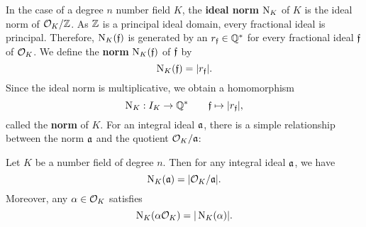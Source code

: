     In the case of a degree $n$ number field $K$, the \textbf{ideal norm} $\operatorname{\mathrm{N}}_{K}$ of $K$ is the ideal norm of $\mathcal{O}_{K}/\mathbb{Z}$. As $\mathbb{Z}$ is a principal ideal domain, every fractional ideal is principal. Therefore, $\operatorname{\mathrm{N}}_{K}(\mathfrak{f})$ is generated by an $r_{\mathfrak{f}} \in \mathbb{Q}^{\ast}$ for every fractional ideal $\mathfrak{f}$ of $\mathcal{O}_{K}$. We define the \textbf{norm} $\operatorname{\mathrm{N}}_{K}(\mathfrak{f})$ of $\mathfrak{f}$ by
    \[
      \operatorname{\mathrm{N}}_{K}(\mathfrak{f}) = |r_{\mathfrak{f}}|.
    \]
    Since the ideal norm is multiplicative, we obtain a homomorphism
    \[
      \operatorname{\mathrm{N}}_{K}:I_{K} \to \mathbb{Q}^{\ast} \qquad \mathfrak{f} \mapsto |r_{\mathfrak{f}}|,
    \]
    called the \textbf{norm} of $K$. For an integral ideal $\mathfrak{a}$, there is a simple relationship between the norm $\mathfrak{a}$ and the quotient $\mathcal{O}_{K}/\mathfrak{a}$:

    \begin{proposition}\label{prop:norm_and_field_norms_are_identical}
      Let $K$ be a number field of degree $n$. Then for any integral ideal $\mathfrak{a}$, we have
      \[
        \operatorname{\mathrm{N}}_{K}(\mathfrak{a}) = |\mathcal{O}_{K}/\mathfrak{a}|.
      \]
      Moreover, any $\alpha \in \mathcal{O}_{K}$ satisfies
      \[
        \operatorname{\mathrm{N}}_{K}(\alpha\mathcal{O}_{K}) = |\operatorname{\mathrm{N}}_{K}(\alpha)|.
      \]
    \end{proposition}
